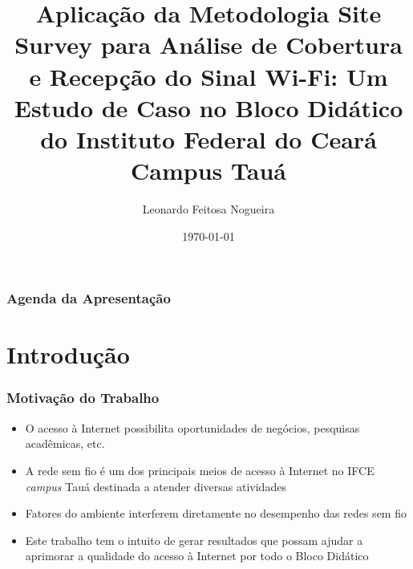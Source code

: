 \documentclass[aspectratio=169,12pt]{beamer}
\title[\textbf{Trabalho de Conclusão de Curso em Tecnologia em Telemática}]{{\Large Aplicação da Metodologia Site Survey para Análise de Cobertura e Recepção do Sinal Wi-Fi: Um Estudo de Caso no Bloco Didático do Instituto Federal do Ceará Campus Tauá}}
\author{Leonardo Feitosa Nogueira}
\institute{INSTITUTO FEDERAL DO CEARÁ -- IFCE CAMPUS TAUÁ}
\date[IFCE Campus Tauá]{\today}
\begin{document}
\begin{frame}[t,plain]
	\titlepage
\end{frame}
\begin{frame}
	\frametitle{Agenda da Apresentação}
	\tableofcontents
\end{frame}
\section{Introdução}
\begin{frame}
	\frametitle{Motivação do Trabalho}
	\begin{itemize}
		\item O acesso à Internet possibilita oportunidades de negócios, pesquisas acadêmicas, etc.
		
		\item A rede sem fio é um dos principais meios de acesso à Internet no IFCE \textit{campus} Tauá destinada a atender diversas atividades
		
		\item Fatores do ambiente interferem diretamente no desempenho das redes sem fio
		
		\item Este trabalho tem o intuito de gerar resultados que possam ajudar a aprimorar a qualidade do acesso à Internet por todo o Bloco Didático
	\end{itemize}
\end{frame}
\end{document}
